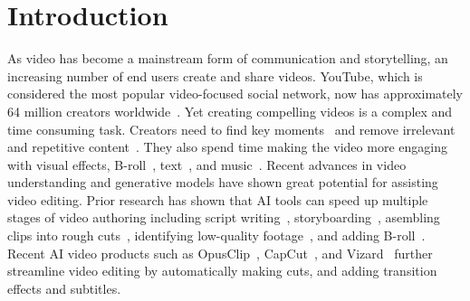\section{Introduction}
As video has become a mainstream form of communication and storytelling, an increasing number of end users create and share videos. YouTube, which is considered the most popular video-focused social network, now has approximately 64 million creators worldwide~\cite{YTstats}.
Yet creating compelling videos is a complex and time consuming task. Creators need to find key moments~\cite{wang2024podreels} and remove irrelevant and repetitive content~\cite{fried2019text, huh2023avscript}. They also spend time making the video more engaging with visual effects, B-roll~\cite{huber2019b}, text~\cite{xie2023wakey}, and music~\cite{rubin2014generating}. 
Recent advances in video understanding and generative models have shown great potential for assisting video editing.  Prior research has shown that AI tools can speed up multiple stages of video authoring including script writing~\cite{mirowski2023co}, storyboarding~\cite{wang2024reelframer}, asembling clips into rough cuts~\cite{chi2013democut, truong2016quickcut}, identifying low-quality footage~\cite{huh2023avscript, fried2019text}, and adding B-roll~\cite{huber2019b}. 
Recent AI video products such as OpusClip~\cite{opus}, CapCut~\cite{capcut}, and Vizard~\cite{vizard} further streamline video editing by automatically making cuts, and adding transition effects and subtitles. 

